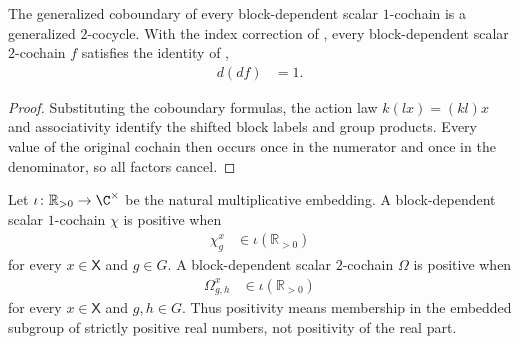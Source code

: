 \begin{lemma}
    \label{thm:mpug_generalized_coboundary_squared}
    \leanok
    The generalized coboundary of every block-dependent scalar $1$-cochain
    is a generalized $2$-cocycle. With the index correction of
    \cite{gap:fbc25_two_cochain_coboundary_index_typo}, every block-dependent
    scalar $2$-cochain $f$ satisfies the identity of
    \cite[line~5922]{FrancoRubio2025MPUGauging},
    \begin{align}
        d(df) & =1.
        \label{eq:mpug_generalized_coboundary_squared}
    \end{align}
\end{lemma}

\begin{proof}\leanok
    Substituting the coboundary formulas, the action law
    $k(lx)=(kl)x$ and associativity identify the shifted block labels and
    group products. Every value of the original cochain then occurs once in
    the numerator and once in the denominator, so all factors cancel.
\end{proof}

\begin{definition}
    \label{def:mpug_positive_generalized_cochains}
    \leanok
    Let $\iota\colon\mathbb R_{>0}\to\C^\times$ be the natural
    multiplicative embedding. A block-dependent scalar $1$-cochain $\chi$ is
    positive when
    \begin{align}
        \chi^x_g & \in\iota(\mathbb R_{>0})
        \label{eq:mpug_positive_one_cochain}
    \end{align}
    for every $x\in\mathsf X$ and $g\in G$. A block-dependent scalar
    $2$-cochain $\Omega$ is positive when
    \begin{align}
        \Omega^x_{g,h} & \in\iota(\mathbb R_{>0})
        \label{eq:mpug_positive_two_cochain}
    \end{align}
    for every $x\in\mathsf X$ and $g,h\in G$. Thus positivity means
    membership in the embedded subgroup of strictly positive real numbers,
    not positivity of the real part.
\end{definition}

